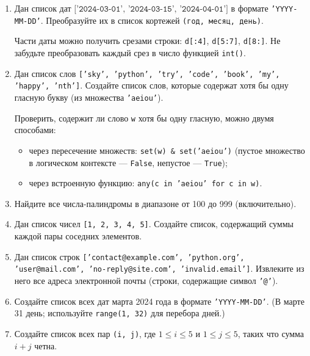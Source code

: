 \documentclass[a4,12pt]{article}
\theoremstyle{remark}
\begin{document}
\begin{enumerate}
    \item Дан список дат $\texttt{['2024-03-01', '2024-03-15', '2024-04-01']}$ в формате \texttt{'YYYY-MM-DD'}. Преобразуйте их в список кортежей \texttt{(год, месяц, день)}.

    \begin{exercisehint}
        Части даты можно получить срезами строки: \texttt{d[:4]}, \texttt{d[5:7]},
        \texttt{d[8:]}. Не забудьте преобразовать каждый срез в число функцией \texttt{int()}.
    \end{exercisehint}

    \item Дан список слов \texttt{['sky', 'python', 'try', 'code', 'book', 'my', 'happy', 'nth']}.
    Создайте список слов, которые содержат хотя бы одну гласную букву
    (из множества \texttt{'aeiou'}).

    \begin{exercisehint}
        Проверить, содержит ли слово \texttt{w} хотя бы одну гласную, можно двумя способами:
        \begin{itemize}
            \item через пересечение множеств: \texttt{set(w) \& set('aeiou')}
            (пустое множество в логическом контексте — \texttt{False}, непустое — \texttt{True});
            \item через встроенную функцию: \texttt{any(c in 'aeiou' for c in w)}.
        \end{itemize}
    \end{exercisehint}

    \item Найдите все числа-палиндромы в диапазоне от 100 до 999 (включительно).
    \item Дан список чисел \texttt{[1, 2, 3, 4, 5]}. Создайте список, содержащий суммы каждой пары соседних элементов.
    \item Дан список строк \texttt{['contact@example.com', 'python.org', 'user@mail.com', 'no-reply@site.com', 'invalid.email']}.  
    Извлеките из него все адреса электронной почты (строки, содержащие символ \texttt{'@'}).

    \item Создайте список всех дат марта 2024 года в формате \texttt{'YYYY-MM-DD'}.
    (В марте 31 день; используйте \texttt{range(1, 32)} для перебора дней.)

    \item Создайте список всех пар \texttt{(i, j)}, где $1 \leqslant i \leqslant 5$ и
    $1 \leqslant j \leqslant 5$, таких что сумма $i + j$ четна.


\end{enumerate}
\end{document}
